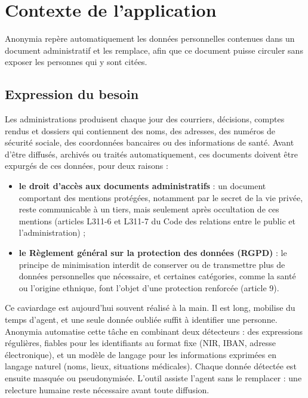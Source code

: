 \documentclass[12pt,a4paper]{article}
\begin{document}

\setcounter{tocdepth}{2}
\tableofcontents
\newpage


\section{Contexte de l'application}

Anonymia repère automatiquement les données personnelles contenues dans un document administratif et les remplace, afin que ce document puisse circuler sans exposer les personnes qui y sont citées.

\subsection{Expression du besoin}

Les administrations produisent chaque jour des courriers, décisions, comptes rendus et dossiers qui contiennent des noms, des adresses, des numéros de sécurité sociale, des coordonnées bancaires ou des informations de santé. Avant d'être diffusés, archivés ou traités automatiquement, ces documents doivent être expurgés de ces données, pour deux raisons :

\begin{itemize}
    \item \textbf{le droit d'accès aux documents administratifs} : un document comportant des mentions protégées, notamment par le secret de la vie privée, reste communicable à un tiers, mais seulement après occultation de ces mentions (articles L311-6 et L311-7 du Code des relations entre le public et l'administration) ;
    \item \textbf{le Règlement général sur la protection des données (RGPD)} : le principe de minimisation interdit de conserver ou de transmettre plus de données personnelles que nécessaire, et certaines catégories, comme la santé ou l'origine ethnique, font l'objet d'une protection renforcée (article 9).
\end{itemize}

Ce caviardage est aujourd'hui souvent réalisé à la main. Il est long, mobilise du temps d'agent, et une seule donnée oubliée suffit à identifier une personne. Anonymia automatise cette tâche en combinant deux détecteurs : des expressions régulières, fiables pour les identifiants au format fixe (NIR, IBAN, adresse électronique), et un modèle de langage pour les informations exprimées en langage naturel (noms, lieux, situations médicales). Chaque donnée détectée est ensuite masquée ou pseudonymisée. L'outil assiste l'agent sans le remplacer : une relecture humaine reste nécessaire avant toute diffusion.
\end{document}
